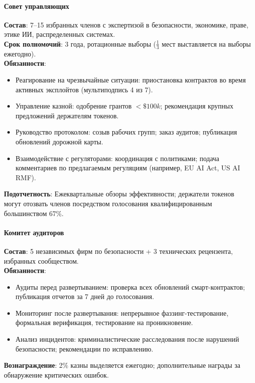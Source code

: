 \documentclass[11pt]{article}
\begin{document}
\paragraph{Совет управляющих}
\textbf{Состав}: 7--15 избранных членов с экспертизой в безопасности, экономике, праве, этике ИИ, распределенных системах.\\
\textbf{Срок полномочий}: 3 года, ротационные выборы ($\frac{1}{3}$ мест выставляется на выборы ежегодно).\\
\textbf{Обязанности}:
\begin{itemize}[noitemsep]
  \item Реагирование на чрезвычайные ситуации: приостановка контрактов во время активных эксплойтов (мультиподпись 4 из 7).
  \item Управление казной: одобрение грантов $<\$100k$; рекомендация крупных предложений держателям токенов.
  \item Руководство протоколом: созыв рабочих групп; заказ аудитов; публикация обновлений дорожной карты.
  \item Взаимодействие с регуляторами: координация с политиками; подача комментариев по предлагаемым регуляциям (например, EU AI Act, US AI RMF).
\end{itemize}
\textbf{Подотчетность}: Ежеквартальные обзоры эффективности; держатели токенов могут отозвать членов посредством голосования квалифицированным большинством 67\%.

\paragraph{Комитет аудиторов}
\textbf{Состав}: 5 независимых фирм по безопасности + 3 технических рецензента, избранных сообществом.\\
\textbf{Обязанности}:
\begin{itemize}[noitemsep]
  \item Аудиты перед развертыванием: проверка всех обновлений смарт-контрактов; публикация отчетов за 7 дней до голосования.
  \item Мониторинг после развертывания: непрерывное фаззинг-тестирование, формальная верификация, тестирование на проникновение.
  \item Анализ инцидентов: криминалистические расследования после нарушений безопасности; рекомендации по исправлению.
\end{itemize}
\textbf{Вознаграждение}: 2\% казны выделяется ежегодно; дополнительные награды за обнаружение критических ошибок.
\end{document}
